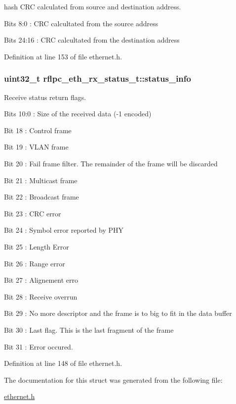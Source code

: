 hash C\-R\-C calculated from source and destination address. 


\begin{DoxyItemize}
\item Bits 8\-:0 \-: C\-R\-C calcultated from the source address
\item Bits 24\-:16 \-: C\-R\-C calcultated from the destination address 
\end{DoxyItemize}

Definition at line 153 of file ethernet.\-h.

\hypertarget{structrflpc__eth__rx__status__t_acb6cbccb75a46eae2026c704e4c7d2d2}{
\subsubsection[{status\-\_\-info}]{\setlength{\rightskip}{0pt plus 5cm}uint32\-\_\-t {\bf rflpc\-\_\-eth\-\_\-rx\-\_\-status\-\_\-t\-::status\-\_\-info}}}\label{structrflpc__eth__rx__status__t_acb6cbccb75a46eae2026c704e4c7d2d2}


Receive status return flags. 


\begin{DoxyItemize}
\item Bits 10\-:0 \-: Size of the received data (-\/1 encoded)
\item Bit 18 \-: Control frame
\item Bit 19 \-: V\-L\-A\-N frame
\item Bit 20 \-: Fail frame filter. The remainder of the frame will be discarded
\item Bit 21 \-: Multicast frame
\item Bit 22 \-: Broadcast frame
\item Bit 23 \-: C\-R\-C error
\item Bit 24 \-: Symbol error reported by P\-H\-Y
\item Bit 25 \-: Length Error
\item Bit 26 \-: Range error
\item Bit 27 \-: Alignement erro
\item Bit 28 \-: Receive overrun
\item Bit 29 \-: No more descriptor and the frame is to big to fit in the data buffer
\item Bit 30 \-: Last flag. This is the last fragment of the frame
\item Bit 31 \-: Error occured. 
\end{DoxyItemize}

Definition at line 148 of file ethernet.\-h.



The documentation for this struct was generated from the following file\-:\begin{DoxyCompactItemize}
\item 
\hyperlink{ethernet_8h}{ethernet.\-h}\end{DoxyCompactItemize}
